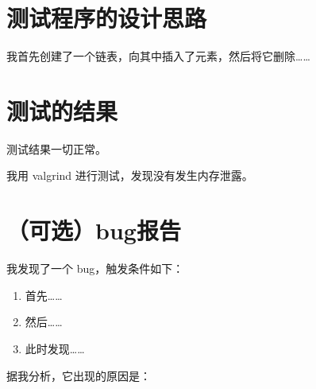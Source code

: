 \documentclass[UTF8]{ctexart}
\begin{document}
\pagestyle{fancy}
\fancyhead{}

\section{测试程序的设计思路}

我首先创建了一个链表，向其中插入了元素，然后将它删除……

\section{测试的结果}

测试结果一切正常。

我用 valgrind 进行测试，发现没有发生内存泄露。

\section{（可选）bug报告}

我发现了一个 bug，触发条件如下：

\begin{enumerate}
    \item 首先……
    \item 然后……
    \item 此时发现……
\end{enumerate}

据我分析，它出现的原因是：
\end{document}
